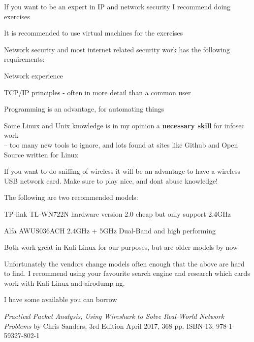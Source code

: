 \documentclass[Screen16to9,17pt]{foils}
\begin{document}
If you want to be an expert in IP and network security I recommend doing exercises

\begin{list1}
\item It is recommended to use virtual machines for the exercises
\item Network security and most internet related security work has the following requirements:
\begin{list2}
\item Network experience
\item TCP/IP principles - often in more detail than a common user
\item Programming is an advantage, for automating things
\item Some Linux and Unix knowledge is in my opinion a {\bf necessary skill} for infosec work\\
-- too many new tools to ignore, and lots found at sites like Github and Open Source written for Linux
\end{list2}
\end{list1}




If you want to do sniffing of wireless it will be an advantage to have a wireless USB network card. Make sure to play nice, and dont abuse knowledge!

\begin{list2}
\item The following are two recommended models:
\item TP-link TL-WN722N hardware version 2.0 cheap but only support 2.4GHz
\item Alfa AWUS036ACH 2.4GHz + 5GHz Dual-Band and high performing
\item Both work great in Kali Linux for our purposes, but are older models by now
\end{list2}

Unfortunately the vendors change models often enough that the above are hard to find. I recommend using your favourite search engine and research which cards work with Kali Linux and airodump-ng.

I have some available you can borrow





\emph{Practical Packet Analysis,
Using Wireshark to Solve Real-World Network Problems}
by Chris Sanders, 3rd Edition
April 2017, 368 pp.
ISBN-13:
978-1-59327-802-1
\end{document}
